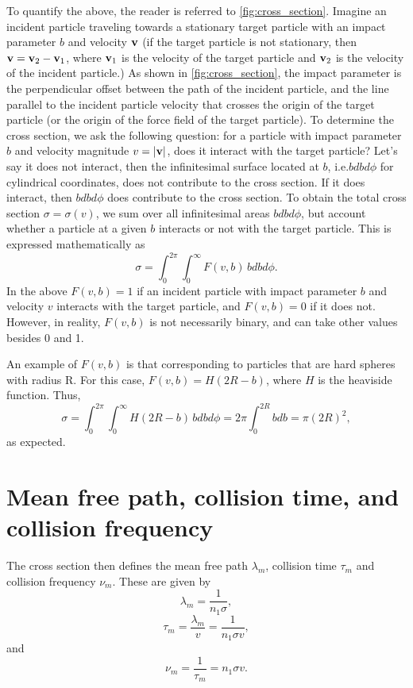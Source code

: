 \documentclass[oneside,a4paper,11pt]{report}
\begin{document}
To quantify the above, the reader is referred to \cref{fig:cross_section}. Imagine an incident particle traveling towards a stationary target particle with an impact parameter $b$ and velocity $\mathbf{v}$ (if the target particle is not stationary, then $\mathbf{v} = \mathbf{v}_2 - \mathbf{v}_1$, where $\mathbf{v}_1$ is the velocity of the target particle and $\mathbf{v}_2$ is the velocity of the incident particle.) As shown in \cref{fig:cross_section}, the impact parameter is the perpendicular offset between the path of the incident particle, and the line parallel to the incident particle velocity that crosses the origin of the target particle (or the origin of the force field of the target particle). To determine the cross section, we ask the following question: for a particle with impact parameter $b$ and velocity magnitude $v = |\mathbf{v}|$, does it interact with the target particle? Let's say it does not interact, then the infinitesimal surface located at $b$, i.e.\@ $b db d\phi$ for cylindrical coordinates, does not contribute to the cross section. If it does interact, then $b db d\phi$ does contribute to the cross section. To obtain the total cross section $\sigma = \sigma(v)$, we sum over all infinitesimal areas $b db d\phi$, but account whether a particle at a given $b$ interacts or not with the target particle. This is expressed mathematically as
\begin{equation}
\label{eq:def_cross_section}
    \sigma = \int_0^{2\pi} \int_0^\infty F(v,b) \, b db d\phi.
\end{equation}
In the above $F(v,b) = 1$ if an incident particle with impact parameter $b$ and velocity $v$ interacts with the target particle, and $F(v,b) = 0$ if it does not. However, in reality, $F(v,b)$ is not necessarily binary, and can take other values besides 0 and 1.

An example of $F(v,b)$ is that corresponding to particles that are hard spheres with radius R. For this case, $F(v,b) = H(2R - b)$, where $H$ is the heaviside function. Thus,
\begin{equation}
    \sigma = \int_0^{2\pi} \int_0^\infty H(2R-b) \, b db d\phi = 2\pi \int_0^{2R} b db = \pi (2R)^2,
\end{equation}
as expected.

\section{Mean free path, collision time, and collision frequency}
The cross section then defines the mean free path $\lambda_m$, collision time $\tau_m$ and collision frequency $\nu_m$. These are given by
\begin{equation}
    \lambda_m = \frac{1}{n_1 \sigma},
\end{equation}
\begin{equation}
    \tau_m = \frac{\lambda_m}{v} = \frac{1}{n_1 \sigma v},
\end{equation}
and
\begin{equation}
    \nu_{m} = \frac{1}{\tau_m} = n_1 \sigma v.
\end{equation}
\end{document}
